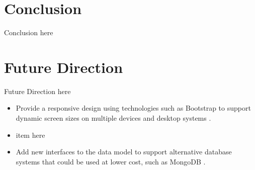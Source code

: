 
\section{Conclusion}

Conclusion here

\section{Future Direction}

Future Direction here 

\begin{itemize}
\item Provide a responsive design using technologies such as Bootstrap to support dynamic screen sizes on multiple devices and desktop systems \cite{bootstrap}.
\item item here
\item Add new interfaces to the data model to support alternative database systems that could be used at lower cost, such as MongoDB \cite{mongodb}.
\end{itemize}
